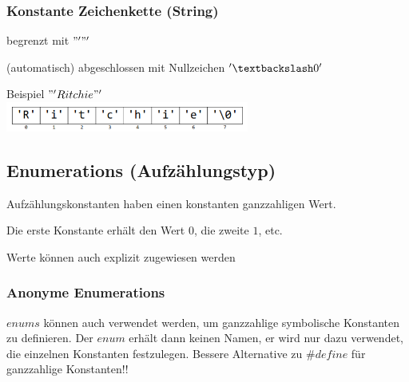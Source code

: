  		\subsubsection{Konstante Zeichenkette (String)}
 			\begin{minipage}[t]{9 cm}
 				\begin{compactitem}
 					\item begrenzt mit $"'  "'$
 					\item (automatisch) abgeschlossen mit Nullzeichen $'\textbackslash0'$
 				\end{compactitem}	
 			\end{minipage}
 			\hspace*{0.5cm}
 			\begin{minipage}[t]{9 cm}
 				Beispiel $"'Ritchie"'$\\
 				\includegraphics[width=0.6\textwidth]{pics/Zeichenkonstante.png}
 			\end{minipage}
 	\subsection{Enumerations (Aufzählungstyp)}
 		\begin{minipage}[t]{9 cm}
	 		\vspace*{-0.5cm}
	 		
 		\end{minipage}
 		\hspace*{0.5 cm}
 		\begin{minipage}[t]{8 cm}
 			\begin{compactitem}
 				\item Aufzählungskonstanten haben einen konstanten ganzzahligen Wert.
 				\item Die erste Konstante erhält den Wert $0$, die zweite $1$, etc.
 				\item Werte können auch explizit zugewiesen werden
 			\end{compactitem}
 		\end{minipage}
 		
 		\subsubsection{Anonyme Enumerations}
 			$enums$ können auch verwendet werden, um ganzzahlige symbolische Konstanten zu definieren. Der $enum$ erhält dann keinen Namen, er wird nur dazu verwendet, die einzelnen Konstanten festzulegen. Bessere Alternative zu $\#define$ für ganzzahlige Konstanten!!
 			
 			\vspace*{0.5cm}
